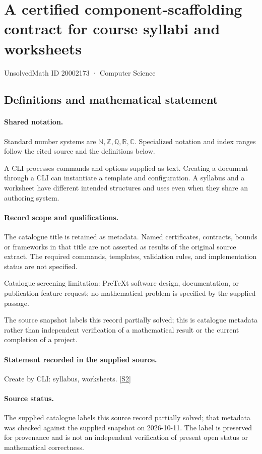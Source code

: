 \documentclass[11pt]{article}
\newcommand{\sref}[2]{\hyperlink{source:#1:#2}{[S#2]}}
\begin{document}
\setcounter{section}{20002172}
\section{A certified component-scaffolding contract for course syllabi and worksheets}\label{20002173}
{\small\sffamily UnsolvedMath ID 20002173 · Computer Science}
\subsection{Definitions and mathematical statement}

\paragraph{Shared notation.}Standard number systems are $\mathbb N,\mathbb Z,\mathbb Q,\mathbb R,\mathbb C$. Specialized notation and index ranges follow the cited source and the definitions below.


A CLI processes commands and options supplied as text. Creating a document through a CLI can instantiate a template and configuration. A syllabus and a worksheet have different intended structures and uses even when they share an authoring system.
\paragraph{Record scope and qualifications.}
The catalogue title is retained as metadata. Named certificates, contracts, bounds or frameworks in that title are not asserted as results of the original source extract.
The required commands, templates, validation rules, and implementation status are not specified.

Catalogue screening limitation: PreTeXt software design, documentation, or publication feature request; no mathematical problem is specified by the supplied passage.

The source snapshot labels this record partially solved; this is catalogue metadata rather than independent verification of a mathematical result or the current completion of a project.
\paragraph{Statement recorded in the supplied source.}
Create by CLI: syllabus, worksheets. \sref{20002173}{2}
\paragraph{Source status.}
The supplied catalogue labels this source record partially solved; that metadata was checked against the supplied snapshot on 2026-10-11. The label is preserved for provenance and is not an independent verification of present open status or mathematical correctness.
\end{document}
